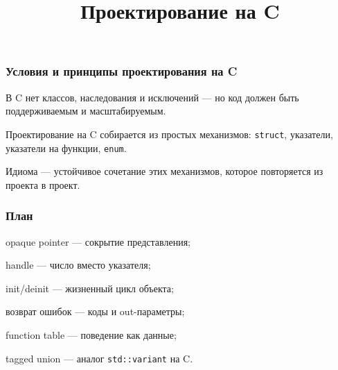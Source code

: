 \documentclass[compress, 8pt, aspectratio=169]{beamer}
\title{Проектирование на C}
\begin{document}
\frame[plain]{\titlepage}

\begin{frame}

    \frametitle{Условия и принципы проектирования на C}

    \begin{myitemize}

        \item В C нет классов, наследования и исключений ---
            но код должен быть поддерживаемым и масштабируемым.

        \item Проектирование на C собирается из простых механизмов:
            \texttt{struct}, указатели, указатели на функции, \texttt{enum}.

        \item Идиома --- устойчивое сочетание этих механизмов,
            которое повторяется из проекта в проект.

    \end{myitemize}

\end{frame}

\begin{frame}

    \frametitle{План}

    \begin{myitemize}

        \item opaque pointer --- сокрытие представления;

        \item handle --- число вместо указателя;

        \item init/deinit --- жизненный цикл объекта;

        \item возврат ошибок --- коды и out-параметры;

        \item function table --- поведение как данные;

        \item tagged union --- аналог \texttt{std::variant} на C.

    \end{myitemize}

\end{frame}
\end{document}

